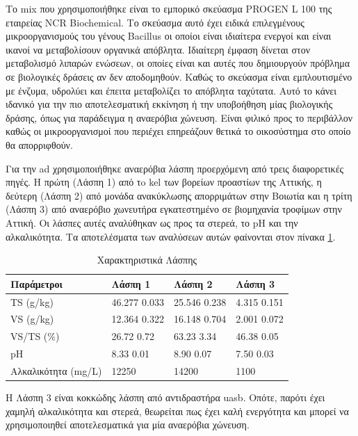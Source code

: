 \documentclass[11pt]{report}
\begin{document}
Το \acrfull{mix} που χρησιμοποιήθηκε είναι το εμπορικό σκεύασμα PROGEN L 100 της εταιρείας NCR Biochemical. Το σκεύασμα αυτό έχει ειδικά επιλεγμένους μικροοργανισμούς του γένους Bacillus οι οποίοι είναι ιδιαίτερα ενεργοί και είναι ικανοί να μεταβολίσουν οργανικά απόβλητα. Ιδιαίτερη έμφαση δίνεται στον μεταβολισμό λιπαρών ενώσεων, οι οποίες είναι και αυτές που δημιουργούν πρόβλημα σε βιολογικές δράσεις αν δεν αποδομηθούν. Καθώς το σκεύασμα είναι εμπλουτισμένο με ένζυμα, υδρολύει και έπειτα μεταβολίζει το απόβλητα ταχύτατα. Αυτό το κάνει ιδανικό για την πιο αποτελεσματική εκκίνηση ή την υποβοήθηση μίας βιολογικής δράσης, όπως για παράδειγμα η αναερόβια χώνευση. Είναι φιλικό προς το περιβάλλον καθώς οι μικροοργανισμοί που περιέχει επηρεάζουν θετικά το οικοσύστημα στο οποίο θα απορριφθούν.

Για την \acrshort{ad} χρησιμοποιήθηκε αναερόβια λάσπη προερχόμενη από τρεις διαφορετικές πηγές. Η πρώτη (Λάσπη 1) από τo \acrfull{kel} των βορείων προαστίων της Αττικής, η δεύτερη (Λάσπη 2) από μονάδα ανακύκλωσης απορριμάτων στην Βοιωτία και η τρίτη (Λάσπη 3) από αναερόβιο χωνευτήρα εγκατεστημένο σε βιομηχανία τροφίμων στην Αττική. Οι λάσπες αυτές αναλύθηκαν ως προς τα στερεά, το pH και την αλκαλικότητα. Τα αποτελέσματα των αναλύσεων αυτών φαίνονται στον πίνακα \ref{tab:orge42f8f6}. 

\begin{table}[htbp]
\caption{\label{tab:orge42f8f6}Χαρακτηριστικά Λάσπης}
\centering
\begin{tabular}{llll}
Παράμετροι & Λάσπη 1 & Λάσπη 2 & Λάσπη 3\\[0pt]
\hline
TS (g/kg) & 46.277 \textpm{} 0.033 & 25.546 \textpm{} 0.238 & 4.315 \textpm{} 0.151\\[0pt]
VS (g/kg) & 12.364 \textpm{} 0.322 & 16.148 \textpm{} 0.704 & 2.001 \textpm{} 0.072\\[0pt]
VS/TS (\%) & 26.72 \textpm{} 0.72 & 63.23 \textpm{} 3.34 & 46.38 \textpm{} 0.05\\[0pt]
pH & 8.33 \textpm{} 0.01 & 8.90 \textpm{} 0.07 & 7.50 \textpm{} 0.03\\[0pt]
Αλκαλικότητα (mg/L) & 12250 & 14200 & 1100\\[0pt]
\end{tabular}
\end{table}

Η Λάσπη 3 είναι κοκκώδης λάσπη από αντιδραστήρα \acrshort{uasb}. Οπότε, παρότι έχει χαμηλή αλκαλικότητα και στερεά, θεωρείται πως έχει καλή ενεργότητα και μπορεί να χρησιμοποιηθεί αποτελεσματικά για μία αναερόβια χώνευση.
\end{document}
